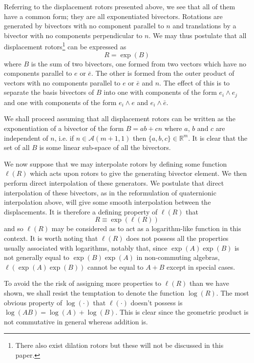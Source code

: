 Referring to the displacement rotors presented above, we
see that all of them have a common form; they are all exponentiated bivectors.
Rotations are generated by bivectors with no component parallel to
$n$ and translations by a bivector with no components perpendicular to $n$. We
may thus postulate that all displacement rotors\footnote{There also exist dilation rotors but 
these will not be discussed in this paper.} can be expressed as
\[
R = \exp(B)
\]
where $B$ is the sum of two bivectors, one formed from two vectors which have no
components parallel to $e$ or $\bar{e}$. The other is formed from the outer product 
of vectors with no components parallel to $e$ or $\bar{e}$ and $n$. The effect of this
is to separate the basis bivectors of $B$ into one with components of the form $e_i \wedge e_j$
and one with components of the form $e_i \wedge e$ and $e_i \wedge \bar{e}$.

We shall proceed assuming that all displacement rotors can be written as
the exponentiation of a bivector of the form $B = ab + cn$ where $a$, $b$ and
$c$ are independent of $n$, i.e. if $n \in \mathcal{A}(m+1,1)$ then $\{a,b,c\} \in \mathbb{R}^m$.
It is clear that the set of all $B$ is some
linear sub-space of all the bivectors.

We now suppose that we may interpolate rotors by defining
some function $\ell(R)$ which acts upon rotors to give the generating
bivector element. We then perform direct interpolation of these generators. We postulate that
direct interpolation of these bivectors, as in the reformulation of quaternionic interpolation
above, will give some smooth interpolation between the displacements.
It is therefore a defining property of $\ell(R)$ that
\begin{equation}
R \equiv \exp(\ell(R))
\end{equation}
and so $\ell(R)$ may be considered as to act as a logarithm-like function in this context.
It is worth noting that $\ell(R)$ does not possess all the properties usually associated with logarithms, notably that, since $\exp(A)\exp(B)$ is not generally equal to $\exp(B)\exp(A)$ in non-commuting algebras,
$\ell(\exp(A)\exp(B))$ cannot be equal to $A + B$ except in special cases.

To avoid the the risk of assigning more properties to $\ell(R)$ than we have shown, we shall
resist the temptation to denote the function $\log(R)$. The most obvious property of $\log(\cdot)$ that
$\ell(\cdot)$ doesn't possess is $\log(AB) = \log(A) + \log(B)$. This is clear since the geometric product
is not commutative in general whereas addition is.

